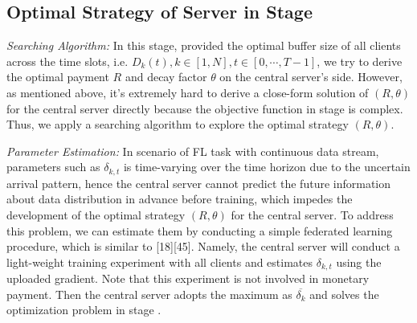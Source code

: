 \documentclass{article}
\theoremstyle{plain}
\theoremstyle{definition}
\theoremstyle{remark}
\begin{document}
\subsection{Optimal Strategy of Server in Stage \uppercase\expandafter{}}
\textit{Searching Algorithm:} In this stage, provided the optimal buffer size of all clients across the time slots, i.e. $D_k(t), k \in [1,N], t \in [0,\cdots,T-1]$, we try to derive the optimal payment $R$ and decay factor $\theta$ on the central server's side.
However, as mentioned above, it's extremely hard to derive a close-form solution of $(R, \theta)$ for the central server directly because the objective function in stage \uppercase\expandafter{} is complex.
Thus, we apply a searching algorithm to explore the optimal strategy $(R,\theta)$.

\textit{Parameter Estimation:} In scenario of FL task with continuous data stream, parameters such as $\delta_{k,t}$ is time-varying over the time horizon due to the uncertain arrival pattern, hence the central server cannot predict the future information about data distribution in advance before training, which impedes the development of the optimal strategy $(R, \theta)$ for the central server.
To address this problem, we can estimate them by conducting a simple federated learning procedure, which is similar to [18][45]. Namely, the central server will conduct a light-weight training experiment with all clients and estimates $\delta_{k,t}$ using the uploaded gradient. Note that this experiment is not involved in monetary payment.
Then the central server adopts the maximum as $\overline{\delta_k}$ and solves the optimization problem in stage \uppercase\expandafter{}.
\end{document}
